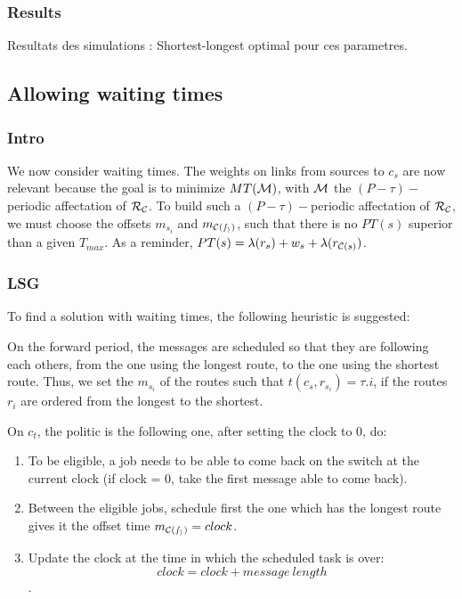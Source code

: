 \documentclass[a4paper,10pt]{article}
\begin{document}
    \subsubsection{Results}
      Resultats des simulations : Shortest-longest optimal pour ces parametres.
      
   \subsection{Allowing waiting times}
   
     \subsubsection{Intro}
	  We now consider waiting times. The weights on links from sources to $c_s$ are now relevant because the goal is to minimize $MT({\cal M})$, with ${\cal M}$ the $(P-\tau)-$periodic affectation of ${\cal R_{\cal C}}$.
	  To build such a $(P-\tau)-$periodic affectation of ${\cal R_{\cal C}}$, we must choose the offsets $m_{s_i}$ and $m_{\cal C(s_i)}$, such that there is no $PT(s)$ superior than a given $T_{max}$.
	  As a reminder, $ PT(s)=\lambda(r_s)+ w_s+\lambda(r_{{\cal C}(s)})$.
     \subsubsection{LSG}
     

To find a solution with waiting times, the following heuristic is suggested:

On the forward period, the messages are scheduled so that they are following each others, from the one using the longest route, to the one using the shortest route. Thus, we set the $m_{s_i}$ of the routes such that  $t(c_s,r_{s_i}) = \tau.i$, if the routes $r_i$ are ordered from the longest to the shortest.

On $c_t$, the politic is the following one, after setting the clock to 0, do:
\begin{enumerate}
 \item To be eligible, a job needs to be able to come back on the switch at the current clock (if clock = 0, take the first message able to come back).
 \item Between the eligible jobs, schedule first the one which has the longest route gives it the offset time $m_{\cal C(s_i)} = clock$.
 \item Update the clock at the time in which the scheduled task is over: $$clock = clock + message\ length$$.
\end{enumerate}
\end{document}

